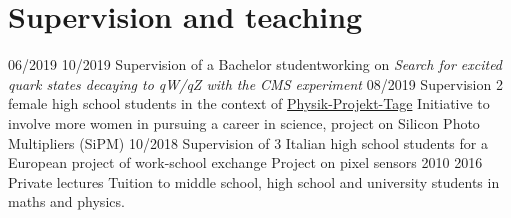 \section{Supervision and teaching}


  \teaching
    {06/2019 \textemdash{} 10/2019}
    {Supervision of a Bachelor student}{working on {\em Search for excited quark states decaying to qW/qZ with the CMS experiment}}
  \teaching
    {08/2019}
    {Supervision 2 female high school students in the context of \href{https://www.ppt.uni-hamburg.de}{Physik-Projekt-Tage}}
    {Initiative to involve more women in pursuing a career in science, project on Silicon Photo Multipliers (SiPM)}
  \teaching
    {10/2018}
    {Supervision of 3 Italian high school students for a European project of work-school exchange}
    {Project on pixel sensors}
  \teaching
    {2010 \textemdash{} 2016}
    {Private lectures}
    {Tuition to middle school, high school and university students in maths and physics.}
